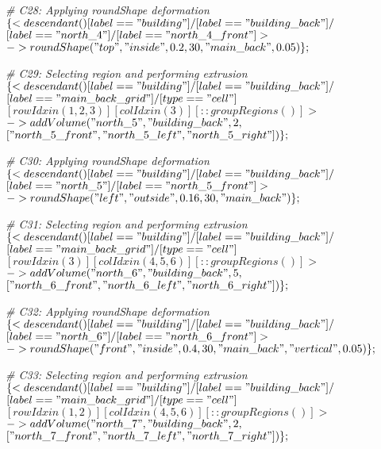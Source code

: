 \noindent \textit{\# C28: Applying roundShape deformation}\\
$\{< descendant() [label=="building"] / [label=="building\_back"] / $\\
$[label=="north\_4"] / [label=="north\_4\_front"] > $\\
$-> roundShape("top", "inside", 0.2, 30, "main\_back", 0.05)\};$

\noindent \textit{\# C29: Selecting region and performing extrusion}\\
$\{< descendant() [label=="building"] / [label=="building\_back"] / $\\
$[label=="main\_back\_grid"] / [type=="cell"] $\\
$[rowIdx in (1, 2, 3)] [colIdx in (3)] [::groupRegions()] > $\\
$-> addVolume("north\_5", "building\_back", 2, $\\
$["north\_5\_front", "north\_5\_left", "north\_5\_right"])\};$

\noindent \textit{\# C30: Applying roundShape deformation}\\
$\{< descendant() [label=="building"] / [label=="building\_back"] / $\\
$[label=="north\_5"] / [label=="north\_5\_front"] > $\\
$-> roundShape("left", "outside", 0.16, 30, "main\_back")\};$

\noindent \textit{\# C31: Selecting region and performing extrusion}\\
$\{< descendant() [label=="building"] / [label=="building\_back"] / $\\
$[label=="main\_back\_grid"] / [type=="cell"] $\\
$[rowIdx in (3)] [colIdx in (4, 5, 6)] [::groupRegions()] > $\\
$-> addVolume("north\_6", "building\_back", 5, $\\
$["north\_6\_front", "north\_6\_left", "north\_6\_right"])\};$

\noindent \textit{\# C32: Applying roundShape deformation}\\
$\{< descendant() [label=="building"] / [label=="building\_back"] / $\\
$[label=="north\_6"] / [label=="north\_6\_front"] > $\\
$-> roundShape("front", "inside", 0.4, 30, "main\_back", "vertical", 0.05)\};$

\noindent \textit{\# C33: Selecting region and performing extrusion}\\
$\{< descendant() [label=="building"] / [label=="building\_back"] / $\\
$[label=="main\_back\_grid"] / [type=="cell"] $\\
$[rowIdx in (1, 2)] [colIdx in (4, 5, 6)] [::groupRegions()] > $\\
$-> addVolume("north\_7", "building\_back", 2, $\\
$["north\_7\_front", "north\_7\_left", "north\_7\_right"])\};$


